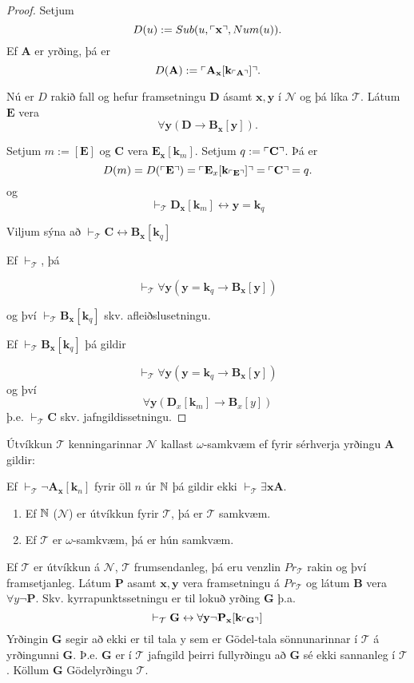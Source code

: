 \documentclass[12pt]{book}
\newcommand{\cT}{\mathcal{T}}
\newcommand{\cN}{\mathcal{N}}
\newcommand{\mb}[1]{\mathbf{#1}}
\newcommand{\bA}{\mathbf{A}}
\newcommand{\bB}{\mathbf{B}}
\newcommand{\bC}{\mathbf{C}}
\newcommand{\bD}{\mathbf{D}}
\newcommand{\bE}{\mathbf{E}}
\newcommand{\bG}{\mathbf{G}}
\newcommand{\bx}{\mathbf{x}}
\newcommand{\bk}{\mathbf{k}}
\newcommand{\by}{\mathbf{y}}
\DeclarePairedDelimiter{\god}{\ulcorner}{\urcorner}
\begin{document}
\begin{proof}
  Setjum
  \[D(u) := Sub(u, \god{\bx},Num(u)). \]
  Ef $\bA$ er yrðing, þá er
  \[D(\bA) := \god{\bA_{\bx}[\bk_{\god{\bA}}]}. \]

  Nú er $D$ rakið fall og hefur framsetningu $\bD$
  ásamt $\bx,\by$ í $\cN$ og
  þá líka $\cT$. Látum $\mb{E}$ vera
  \[ \forall \by (\bD \rightarrow \bB_{\bx}[\by]). \]

  Setjum $m:= [\mb{E}]$ og $\bC$ vera $\mb{E}_{\bx}[\bk_m]$. Setjum $q:= \god{\bC}$.
  Þá er
  \[ D(m) = D(\god{\mb{E}}) = \god{\bE_x[\bk_{\god{\bE}}]} = \god{\bC} = q .\]
  og
  \[ \vdash_{\cT} \bD_{\bx}[\bk_m] \leftrightarrow \by = \bk_q \]

  Viljum sýna að $\vdash_{\cT} \bC \leftrightarrow \bB_{\bx} [\bk_{q}] $
  
  Ef $\vdash_{\cT}$, þá

  \[\vdash_{\cT} \forall \by ( \by = \bk_q \rightarrow \bB_{\bx}[\by])\]

  og því $\vdash_{\cT} \bB_{\bx}[\bk_q]$ skv. afleiðslusetningu.

  Ef $\vdash_{\cT} \bB_{\bx}[\bk_q]$ þá gildir
  
  \[\vdash_{\cT} \forall \by ( \by = \bk_q \rightarrow \bB_{\bx}[\by])\]
  og því
  \[ \forall \by ( \bD_{x}[\bk_m] \rightarrow \bB_x[y]) \]
  þ.e. $\vdash_{\cT} \bC$ skv. jafngildissetningu.

\end{proof}


\begin{skgr}
  Útvíkkun $\cT$ kenningarinnar $\cN$
  kallast $\omega$-samkvæm ef fyrir sérhverja yrðingu 
  $\bA$ gildir:
  
  Ef $\vdash_{\cT} \lnot \bA_{\bx}[\bk_n]$ fyrir öll $n$ úr $\mathbb{N}$
  þá gildir ekki $\vdash_{\cT} \exists \bx \bA$.
\end{skgr}

\begin{ath}
  \begin{enumerate}[(1)]
  \item Ef $\mathbb{N}$ ($\cN$) er útvíkkun fyrir $\cT$, þá er $\cT$ samkvæm.

  \item Ef $\cT$ er $\omega$-samkvæm, þá er hún samkvæm.
  \end{enumerate}
\end{ath}

Ef $\cT$ er útvíkkun á $\cN$, $\cT$ frumsendanleg, þá eru venzlin
$Pr_{\cT}$ rakin og því framsetjanleg.
Látum $\mb{P}$ asamt $\bx, \by$ vera framsetningu á 
$Pr_{\cT}$ og látum $\bB$ vera $\forall y \lnot \mb{P}$.
Skv. kyrrapunktssetningu er til lokuð yrðing $\mb{G}$ þ.a.
\[\vdash_{\cT} \mb{G} \leftrightarrow \forall \by \lnot \mb{P}_{\bx}[\bk_{\god{\mb{G}}}]\]
Yrðingin $\mb{G}$ segir að ekki er til tala y sem er
Gödel-tala sönnunarinnar í $\cT$ á yrðingunni $\mb{G}$.
Þ.e. $\mb{G}$ er í $\cT$  jafngild þeirri fullyrðingu að $\mb{G}$
sé ekki sannanleg í $\cT$. Köllum $\bG$ Gödelyrðingu $\cT$.
\end{document}

